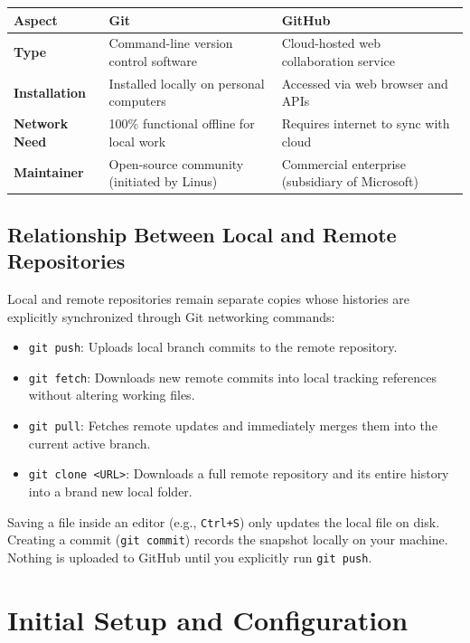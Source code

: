 \begin{center}
\small
\renewcommand{\arraystretch}{1.25}
\begin{tabularx}{\textwidth}{l X X}
\toprule
\textbf{Aspect} & \textbf{Git} & \textbf{GitHub} \\
\midrule
\textbf{Type} & Command-line version control software & Cloud-hosted web collaboration service \\
\textbf{Installation} & Installed locally on personal computers & Accessed via web browser and APIs \\
\textbf{Network Need} & 100\% functional offline for local work & Requires internet to sync with cloud \\
\textbf{Maintainer} & Open-source community (initiated by Linus) & Commercial enterprise (subsidiary of Microsoft) \\
\bottomrule
\end{tabularx}
\end{center}

\subsection{Relationship Between Local and Remote Repositories}
Local and remote repositories remain separate copies whose histories are explicitly synchronized through Git networking commands:
\begin{itemize}[leftmargin=1.2em]
    \item \texttt{git push}: Uploads local branch commits to the remote repository.
    \item \texttt{git fetch}: Downloads new remote commits into local tracking references without altering working files.
    \item \texttt{git pull}: Fetches remote updates and immediately merges them into the current active branch.
    \item \texttt{git clone <URL>}: Downloads a full remote repository and its entire history into a brand new local folder.
\end{itemize}

\begin{examalert}
Saving a file inside an editor (e.g., \texttt{Ctrl+S}) only updates the local file on disk. Creating a commit (\texttt{git commit}) records the snapshot locally on your machine. Nothing is uploaded to GitHub until you explicitly run \texttt{git push}.
\end{examalert}

\section{Initial Setup and Configuration}

